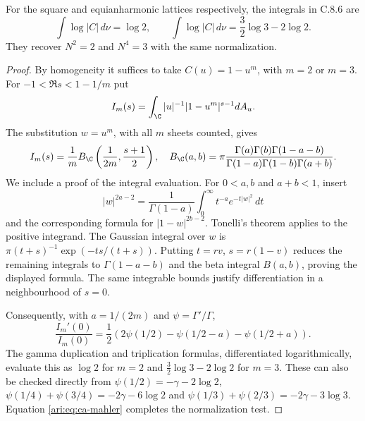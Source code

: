 \begin{proposition}\label{ari:C.8.7}
For the square and equianharmonic lattices respectively, the
integrals in C.8.6 are
\[
 \int\log|C|\,d\nu=\log2,\qquad
 \int\log|C|\,d\nu=\frac32\log3-2\log2.
\]
They recover $N^2=2$ and $N^4=3$ with the same normalization.
\end{proposition}
\begin{proof}
By homogeneity it suffices to take $C(u)=1-u^m$, with $m=2$
or $m=3$. For $-1<\Re s<1-1/m$ put
\[
 I_m(s)=\int_{\C} |u|^{-1}|1-u^m|^{s-1}dA_u.
\]
The substitution $w=u^m$, with all $m$ sheets counted, gives
\[
 I_m(s)=\frac1m B_{\C}\left(\frac1{2m},\frac{s+1}2\right),
 \quad
 B_{\C}(a,b)=\pi\frac{\Gamma(a)\Gamma(b)\Gamma(1-a-b)}
                   {\Gamma(1-a)\Gamma(1-b)\Gamma(a+b)}.
\]
We include a proof of the integral evaluation. For
$0<a,b$ and $a+b<1$, insert
\[
 |w|^{2a-2}=\frac1{\Gamma(1-a)}
       \int_0^\infty t^{-a}e^{-t|w|^2}\,dt
\]
and the corresponding formula for $|1-w|^{2b-2}$.
Tonelli's theorem applies to the positive integrand. The
Gaussian integral over $w$ is
$\pi(t+s)^{-1}\exp(-ts/(t+s))$.
Putting $t=rv$, $s=r(1-v)$ reduces the remaining integrals
to $\Gamma(1-a-b)$ and the beta integral $B(a,b)$, proving
the displayed formula. The same integrable bounds justify
differentiation in a neighbourhood of $s=0$.

Consequently, with $a=1/(2m)$ and $\psi=\Gamma'/\Gamma$,
\[
 \frac{I_m'(0)}{I_m(0)}
 =\frac12\left(2\psi(1/2)-\psi(1/2-a)-\psi(1/2+a)\right).
\]
The gamma duplication and triplication formulas, differentiated
logarithmically, evaluate this as $\log2$ for $m=2$ and
$\frac32\log3-2\log2$ for $m=3$. These can also be checked
directly from
$\psi(1/2)=-\gamma-2\log2$,
$\psi(1/4)+\psi(3/4)=-2\gamma-6\log2$ and
$\psi(1/3)+\psi(2/3)=-2\gamma-3\log3$.
Equation \eqref{ari:eq:ca-mahler} completes the normalization test.
\end{proof}

